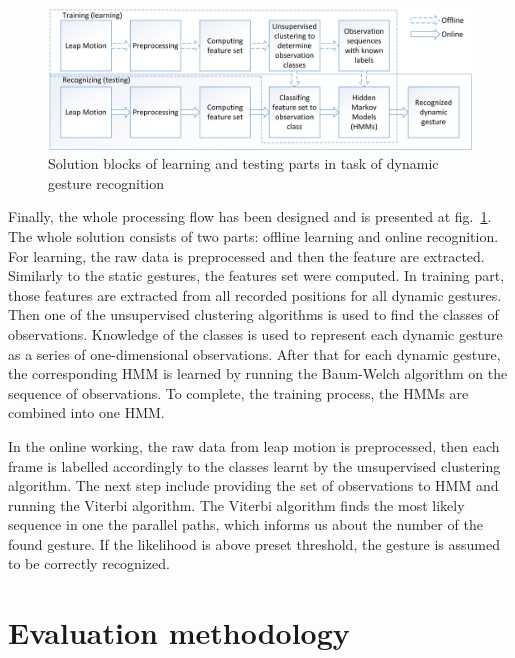 \begin{figure}[htb]
\centering
 \includegraphics[width=1\columnwidth]{figures/DynamicGestures.png}
 \caption{Solution blocks of learning and testing parts in task of dynamic gesture recognition}
 \label{dynamicgesturesflow}
\end{figure}

Finally, the whole processing flow has been designed and is presented at fig.~\ref{dynamicgesturesflow}.
The whole solution consists of two parts: offline learning and online recognition.
For learning, the raw data is preprocessed and then the feature are extracted. 
Similarly to the static gestures, the features set were computed. 
In training part, those features are extracted from all recorded positions for all dynamic gestures.
Then one of the unsupervised clustering algorithms is used to find the classes of observations.
Knowledge of the classes is used to represent each dynamic gesture as a series of one-dimensional observations.
After that for each dynamic gesture, the corresponding HMM is learned by running the Baum-Welch algorithm on the sequence of observations.
To complete, the training process, the HMMs are combined into one HMM.

In the online working, the raw data from leap motion is preprocessed, then each frame is labelled accordingly to the classes learnt by the unsupervised clustering algorithm.
The next step include providing the set of observations to HMM and running the Viterbi algorithm.
The Viterbi algorithm finds the most likely sequence in one the parallel paths, which informs us about the number of the found gesture. 
If the likelihood is above preset threshold, the gesture is assumed to be correctly recognized.


\section{Evaluation methodology}

